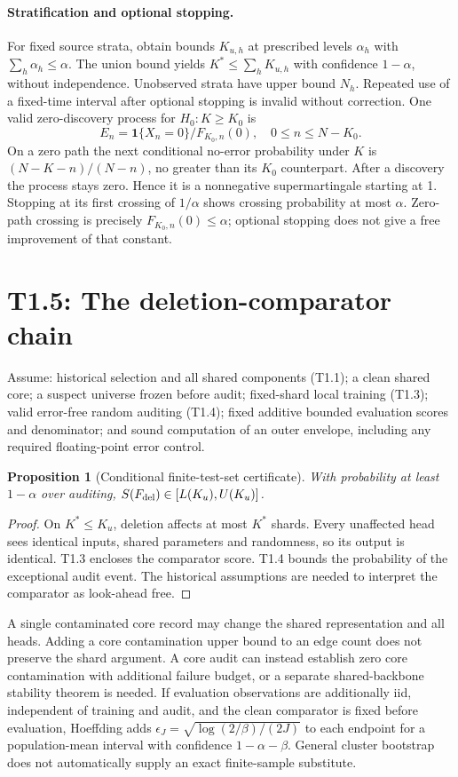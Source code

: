 \documentclass[11pt]{article}
\newtheorem{proposition}{Proposition}
\newcommand{\ind}{\mathbf 1}
\begin{document}
\paragraph{Stratification and optional stopping.}
For fixed source strata, obtain bounds $K_{u,h}$ at prescribed levels
$\alpha_h$ with $\sum_h\alpha_h\le\alpha$. The union bound yields
$K^*\le\sum_hK_{u,h}$ with confidence $1-\alpha$, without independence.
Unobserved strata have upper bound $N_h$.
Repeated use of a fixed-time interval after optional stopping is invalid
without correction. One valid zero-discovery process for $H_0:K\ge K_0$
is
\[
E_n=\ind\{X_n=0\}/F_{K_0,n}(0),\quad0\le n\le N-K_0.
\]
On a zero path the next conditional no-error probability under $K$ is
$(N-K-n)/(N-n)$, no greater than its $K_0$ counterpart. After a discovery
the process stays zero. Hence it is a nonnegative supermartingale starting
at 1. Stopping at its first crossing of $1/\alpha$ shows crossing probability
at most $\alpha$. Zero-path crossing is precisely $F_{K_0,n}(0)\le\alpha$;
optional stopping does not give a free improvement of that constant.

\section{T1.5: The deletion-comparator chain}
Assume: historical selection and all shared components (T1.1); a clean
shared core; a suspect universe frozen before audit; fixed-shard local
training (T1.3); valid error-free random auditing (T1.4); fixed additive
bounded evaluation scores and denominator; and sound computation of an
outer envelope, including any required floating-point error control.

\begin{proposition}[Conditional finite-test-set certificate]
With probability at least $1-\alpha$ over auditing,
$S(F_{\rm del})\in[L(K_u),U(K_u)]$.
\end{proposition}
\begin{proof}
On $K^*\le K_u$, deletion affects at most $K^*$ shards. Every unaffected
head sees identical inputs, shared parameters and randomness, so its
output is identical. T1.3 encloses the comparator score. T1.4 bounds the
probability of the exceptional audit event. The historical assumptions
are needed to interpret the comparator as look-ahead free.
\end{proof}

A single contaminated core record may change the shared representation
and all heads. Adding a core contamination upper bound to an edge count
does not preserve the shard argument. A core audit can instead establish
zero core contamination with additional failure budget, or a separate
shared-backbone stability theorem is needed.
If evaluation observations are additionally iid, independent of training
and audit, and the clean comparator is fixed before evaluation, Hoeffding
adds $\epsilon_J=\sqrt{\log(2/\beta)/(2J)}$ to each endpoint for a
population-mean interval with confidence $1-\alpha-\beta$. General cluster
bootstrap does not automatically supply an exact finite-sample substitute.
\end{document}
